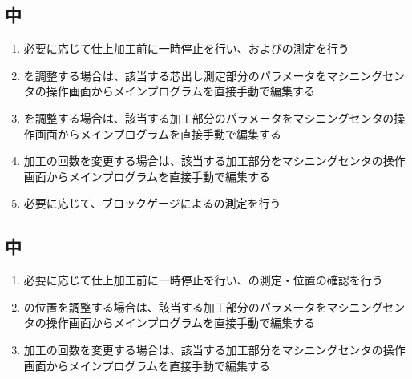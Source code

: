 \subsection{\KeywayMilling 中}
\begin{enumerate}[label=\sarrow]
\item 必要に応じて仕上加工前に一時停止を行い、\AsideKeywayDepth および\KeywayDiameter の測定を行う
\item \AsideKeywayDepth を調整する場合は、該当する芯出し測定部分のパラメータをマシニングセンタの操作画面からメインプログラムを直接手動で編集する
\item \KeywayDiameter を調整する場合は、該当する加工部分のパラメータをマシニングセンタの操作画面からメインプログラムを直接手動で編集する
\item {}加工の回数を変更する場合は、該当する加工部分をマシニングセンタの操作画面からメインプログラムを直接手動で編集する
\item 必要に応じて、ブロックゲージによる\KeywayWidth の測定を行う
\end{enumerate}


\subsection{\EndFaceCChamferMilling 中}
\begin{enumerate}[label=\sarrow]
\item 必要に応じて仕上加工前に一時停止を行い、\EndFaceOutCChamfer の測定・位置の確認を行う
\item \EndFaceOutCChamfer の位置を調整する場合は、該当する加工部分のパラメータをマシニングセンタの操作画面からメインプログラムを直接手動で編集する
\item {}加工の回数を変更する場合は、該当する加工部分をマシニングセンタの操作画面からメインプログラムを直接手動で編集する
\end{enumerate}


